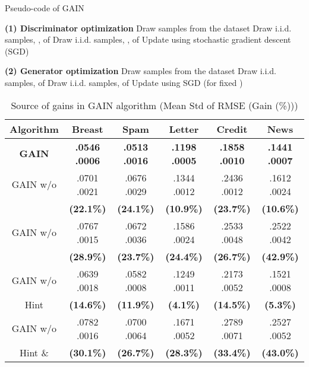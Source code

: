 \documentclass{article}
\begin{document}
\begin{algorithm}[h!]
	\caption{Pseudo-code of GAIN}\label{alg:pseudo}
	\begin{algorithmic} 
		\STATE \textbf{(1) Discriminator optimization} 
		\STATE Draw  samples from the dataset 
		\STATE Draw  i.i.d. samples, , of 
		\STATE Draw  i.i.d. samples, , of 
		\FOR {}
		\STATE 
		\STATE 
		\STATE 
		\ENDFOR
		\STATE Update  using stochastic gradient descent (SGD) 
		
		\STATE \textbf{(2) Generator optimization} 
		\STATE Draw  samples from the dataset 
		\STATE Draw  i.i.d. samples,  of 
		\STATE Draw  i.i.d. samples,  of 
		\FOR {}
		\STATE 
		\ENDFOR
		\STATE Update  using SGD (for fixed ) 
		
		\ENDWHILE
	\end{algorithmic} 
\end{algorithm}



    \begin{table*}[t!]
        \renewcommand{\arraystretch}{1.3}
        \caption{Source of gains in GAIN algorithm (Mean  Std of RMSE (Gain (\%)))}    
        \label{table:sourceofgain}
        \centering
        \begin{tabular}{ |c|| c | c  |  c| c | c |  }
            \toprule
            \textbf{Algorithm}    & \textbf{Breast} &  \textbf{Spam} & \textbf{Letter}& \textbf{Credit} & \textbf{News}   \\ \midrule
            \textbf{GAIN} & \textbf{.0546  .0006} & \textbf{.0513 .0016} & \textbf{.1198 .0005}  & \textbf{.1858  .0010} & \textbf{.1441  .0007}  \\   \midrule
            GAIN w/o  & .0701  .0021  & .0676  .0029 & .1344  .0012  & .2436  .0012 & .1612  .0024   \\ 
             & \textbf{(22.1\%)} & \textbf{(24.1\%) }& \textbf{(10.9\%) }& \textbf{(23.7\%)} & \textbf{(10.6\%)} \\  \midrule
            GAIN w/o   & .0767  .0015 & .0672  .0036 & .1586  .0024 & .2533  .0048 & .2522  .0042  \\
            & \textbf{(28.9\%)} & \textbf{(23.7\%) }& \textbf{(24.4\%) }& \textbf{(26.7\%)} & \textbf{(42.9\%)}\\   \midrule
            GAIN w/o  & .0639  .0018 & .0582  .0008 & .1249  .0011  & .2173  .0052 & .1521  .0008   \\ 
            Hint & \textbf{(14.6\%)} & \textbf{(11.9\%)} & \textbf{(4.1\%)} & \textbf{(14.5\%)} & \textbf{(5.3\%)} \\  \midrule
            GAIN w/o   &.0782  .0016  & .0700  .0064& .1671  .0052 & .2789  .0071& .2527  .0052  \\
            Hint \&  & \textbf{(30.1\%)} & \textbf{(26.7\%)} & \textbf{(28.3\%)} & \textbf{(33.4\%)} & \textbf{(43.0\%)}\\
            \bottomrule
        \end{tabular}
    \end{table*}
\end{document}
